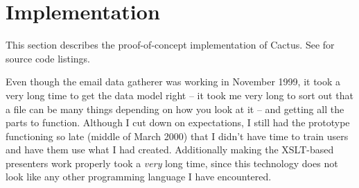 





\chapter{Implementation}

\label{cha:cactus-implementation}






This section describes the proof-of-concept implementation of Cactus.
See  for source code listings.

Even though the email data gatherer was working in November 1999, it
took a very long time to get the data model right -- it took me very
long to sort out that a file can be many things depending on how you
look at it --  and getting all the
parts to function.  Although I cut down on expectations, I still had
the prototype functioning so late (middle of March 2000) that I didn't have
time to train users and have them use what I had created.
Additionally making the XSLT-based presenters work properly took a
\textit{very} long time, since this technology does not look like any
other programming language I have encountered.

